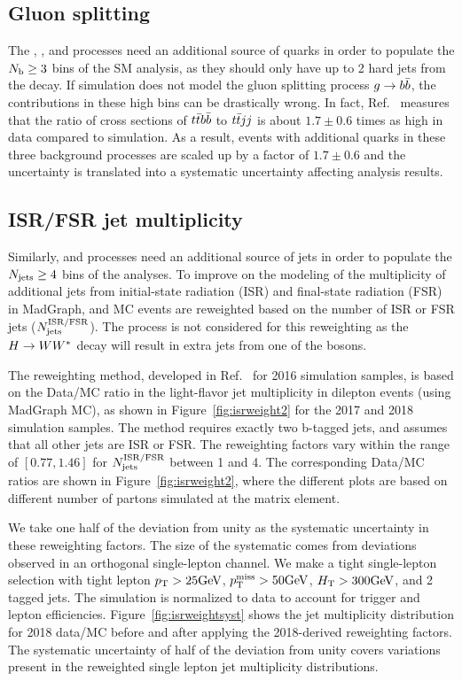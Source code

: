 \subsection{Gluon splitting}

The \ttW, \ttZ, and \ttH processes need an additional source of \cPqb quarks
in order to populate the $N_\mathrm{b}\geq 3$ bins of the SM \tttt analysis, as
they should only have up to 2 hard \cPqb jets from the \ttbar decay.
If simulation does not model the gluon splitting process $g\rightarrow b\bar{b}$,
the contributions in these high \Nbjets bins can be drastically wrong.
In fact, Ref.~\cite{CMS:ttbb} measures that the ratio of cross sections
of $t\bar{t}b\bar{b}$ to $t\bar{t} jj$ is about $1.7\pm0.6$ times as high in data
compared to simulation. As a result, events with additional \cPqb quarks
in these three background processes are scaled up by a factor of 
$1.7\pm0.6$ and the uncertainty is translated into
a systematic uncertainty affecting analysis results. 

\subsection{ISR/FSR jet multiplicity}

Similarly, \ttW and \ttZ processes need an additional source of jets
in order to populate the $N_\text{jets} \geq 4$ bins of the analyses.
To improve on the modeling of the
multiplicity of additional jets from initial-state radiation (ISR) and
final-state radiation (FSR) in MadGraph,
\ttW and \ttZ MC events are reweighted based on the
number of ISR or FSR jets ($N_\text{jets}^{\rm ISR/FSR}$).
The \ttH process is not considered for this reweighting as
the $H\rightarrow WW^*$ decay will result in extra jets from one
of the \PW bosons.

The reweighting method, developed in Ref.~\cite{CMS:isrweight} for 2016
simulation samples, is based on the Data/MC ratio in the light-flavor jet
multiplicity in dilepton \ttbar events (using MadGraph MC), as shown in
Figure~\ref{fig:isrweight2} for the 2017 and 2018 simulation samples. The
method requires exactly two b-tagged jets, and assumes that all other jets
are ISR or FSR. The reweighting factors vary within the range of
$[0.77,1.46]$ for $N_\text{jets}^{\rm ISR/FSR}$ between 1 and 4. The corresponding
Data/MC ratios are shown in Figure~\ref{fig:isrweight2}, where the different
plots are based on different number of partons simulated at the matrix
element. 

We take one half of the deviation from unity as the systematic
uncertainty in these reweighting factors.
The size of the systematic comes from deviations observed in an orthogonal
single-lepton channel. We make a tight single-lepton selection with tight
lepton $p_{\mathrm{T}}>25\text{GeV}$, $p_{\mathrm{T}}^\text{miss}>50\text{GeV}$, $H_{\mathrm{T}}>300\text{GeV}$, and 2 \PQb tagged jets. 
The simulation is normalized to data to account for trigger and lepton efficiencies.
Figure~\ref{fig:isrweightsyst} shows the jet multiplicity distribution for 2018 data/MC before and after
applying the 2018-derived reweighting factors. The systematic uncertainty of half of the deviation from unity covers
variations present in the reweighted single lepton jet multiplicity distributions.

